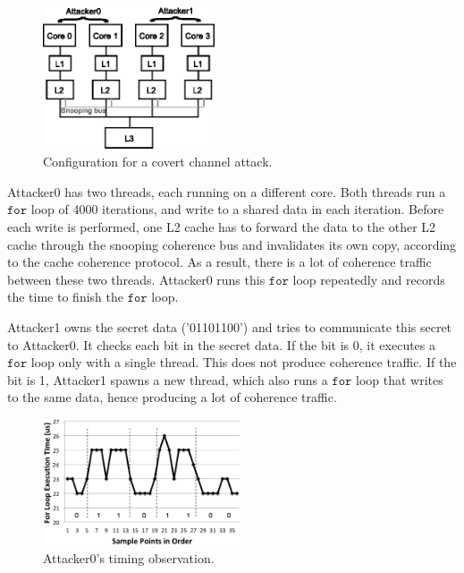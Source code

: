 \begin{figure}
    \begin{center}
        \includegraphics[width=2in]{figs/coherent_system.eps}
        \caption{Configuration for a covert channel attack.}
        \label{fig:coherent_system}
		\vspace{-0.2in}
    \end{center}
\end{figure}

Attacker0 has two threads, each running on a different core. Both threads run a 
$\mathtt{for }$ loop of 4000 iterations, and
write to a shared data in each iteration. Before each write is performed, one 
L2 cache has to forward the data
to the other L2 cache through the snooping coherence bus and invalidates its own copy, 
according to the cache coherence protocol.  As a result, there is a lot of 
coherence traffic between these two threads. Attacker0 runs this $\mathtt{for }$ loop 
repeatedly and
records the time to finish the $\mathtt{for }$ loop.%

Attacker1 owns the secret data ('01101100') and tries to communicate this 
secret to Attacker0. It checks each bit
in the secret data. If the bit is 0, it executes a $\mathtt{for }$ loop only with a 
single thread.
This does not produce coherence traffic. If the bit is 
1, Attacker1 spawns a new thread, which also runs a $\mathtt{for }$ loop that writes to 
the same data, hence producing a lot of coherence traffic. 

\begin{figure}
    \begin{center}
        \includegraphics[width=2.3in]{figs/coherence_interference.eps}
        \caption{Attacker0's timing observation.}
        \label{fig:coherence_interference}
		\vspace{-0.2in}
    \end{center}
\end{figure}

